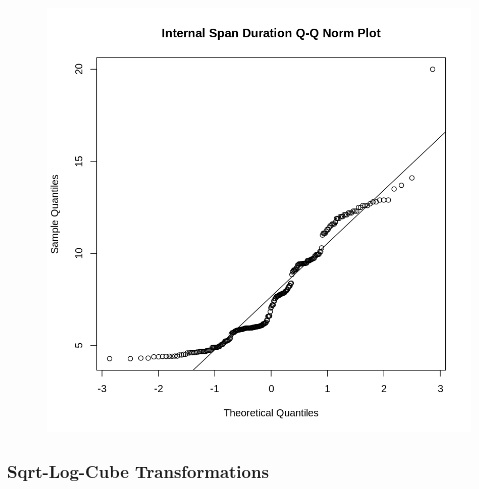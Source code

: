 \documentclass[
  letterpaper,
  DIV=11,
  numbers=noendperiod]{scrartcl}
\newenvironment{Shaded}{\begin{snugshade}}{\end{snugshade}}
\newcommand{\AttributeTok}[1]{\textcolor[rgb]{0.40,0.45,0.13}{#1}}
\newcommand{\FunctionTok}[1]{\textcolor[rgb]{0.28,0.35,0.67}{#1}}
\newcommand{\NormalTok}[1]{\textcolor[rgb]{0.00,0.23,0.31}{#1}}
\newcommand{\SpecialCharTok}[1]{\textcolor[rgb]{0.37,0.37,0.37}{#1}}
\newcommand{\StringTok}[1]{\textcolor[rgb]{0.13,0.47,0.30}{#1}}
\begin{document}
\begin{Shaded}
\end{Shaded}

\begin{figure}[H]

{\centering \includegraphics{dss-span-analysis-rev5_files/figure-pdf/cell-63-output-1.png}

}

\end{figure}

\hypertarget{sqrt-log-cube-transformations}{%
\subsubsection{Sqrt-Log-Cube
Transformations}\label{sqrt-log-cube-transformations}}
\end{document}
